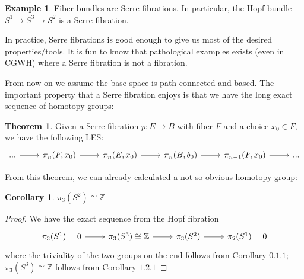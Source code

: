 \documentclass{article}
\theoremstyle{definition}
\newtheorem{theorem}{Theorem}[section]
\theoremstyle{definition}
\theoremstyle{definition}
\theoremstyle{definition}
\theoremstyle{definition}
\newtheorem{corollary}{Corollary}[theorem]
\theoremstyle{definition}
\newtheorem{example}{Example}[theorem]
\begin{document}
\begin{tcolorbox}[colback=yellow!5!white,colframe=yellow!30!white]
\begin{example}
	Fiber bundles are Serre fibrations. In particular, the Hopf bundle $S^1\to S^3\to S^2$ is a Serre fibration. 
\end{example}
\end{tcolorbox}

In practice, Serre fibrations is good enough to give us most of the desired properties/tools. It is fun to know that pathological examples exists (even in CGWH) where a Serre fibration is not a fibration. 

From now on we assume the base-space is path-connected and based. The important property that a Serre fibration enjoys is that we have the long exact sequence of homotopy groups:
\begin{tcolorbox}[colback=red!5!white,colframe=red!30!white]
\begin{theorem}
Given a Serre fibration $p:E\to B$ with fiber $F$ and a choice $x_0\in F$, we have the following LES:
\[
\begin{tikzcd}
...\arrow[r]&\pi_n(F,x_0)\arrow[r]&\pi_n(E,x_0)\arrow[r]&\pi_n(B,b_0)\arrow[r]&\pi_{n-1}(F,x_0)\arrow[r]&...
\end{tikzcd}
\]
\end{theorem}
\end{tcolorbox}
From this theorem, we can already calculated a not so obvious homotopy group:
\begin{tcolorbox}[colback=green!5!white,colframe=green!30!white]
\begin{corollary}
$\pi_3(S^2)\cong \mathbb{Z}$
\end{corollary}
\end{tcolorbox}
\begin{proof}
    We have the exact sequence from the Hopf fibration
    \[
    \begin{tikzcd}
    \pi_3(S^1)=0\arrow[r]&\pi_3(S^3)\cong \mathbb{Z}\arrow[r]&\pi_3(S^2)\arrow[r]&\pi_2(S^1)=0
    \end{tikzcd}
    \]
    where the triviality of the two groups on the end follows from Corollary $0.1.1$; $\pi_3(S^3)\cong \mathbb{Z}$ follows from Corollary $1.2.1$
\end{proof}
 
\end{document}
